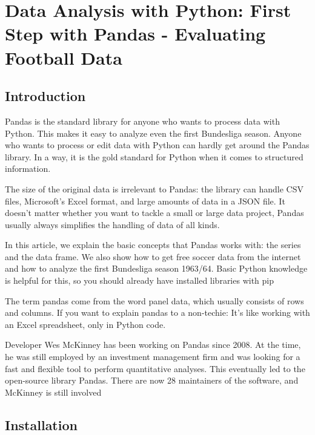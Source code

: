 %
%
%


\chapter{Data Analysis with Python: First Step with Pandas - Evaluating Football Data}


\section{Introduction}
Pandas is the standard library for anyone who wants to process data with Python. This makes it easy to analyze even the first Bundesliga season. Anyone who wants to process or edit data with Python can hardly get around the Pandas library. In a way, it is the gold standard for Python when it comes to structured information.

The size of the original data is irrelevant to Pandas: the library can handle CSV files, Microsoft's Excel format, and large amounts of data in a JSON file. It doesn't matter whether you want to tackle a small or large data project, Pandas usually always simplifies the handling of data of all kinds.

In this article, we explain the basic concepts that Pandas works with: the series and the data frame. We also show how to get free soccer data from the internet and how to analyze the first Bundesliga season 1963/64. Basic Python knowledge is helpful for this, so you should already have installed libraries with pip

The term pandas come from the word panel data, which usually consists of rows and columns. If you want to explain pandas to a non-techie: It's like working with an Excel spreadsheet, only in Python code.

Developer Wes McKinney has been working on Pandas since 2008. At the time, he was still employed by an investment management firm and was looking for a fast and flexible tool to perform quantitative analyses. This eventually led to the open-source library Pandas. There are now 28 maintainers of the software, and McKinney is still  involved




\section{Installation}

